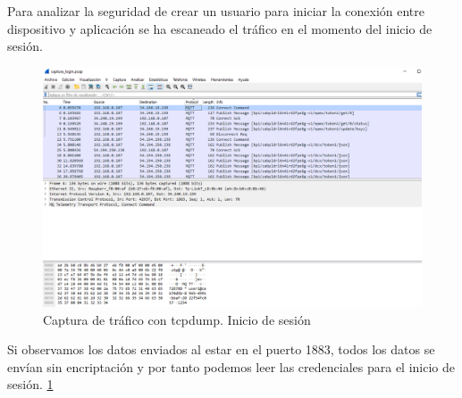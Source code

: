{Para analizar la seguridad de crear un usuario para iniciar la conexión entre dispositivo y aplicación se ha escaneado el tráfico en el momento del inicio de sesión. \\

\begin{figure}[p]
    \centering
    \includegraphics[width=\linewidth]{imagenes/Captura de pantalla 2022-06-26 190942.png}
    \caption{Captura de tráfico con tcpdump. Inicio de sesión}
    \label{fig:figure23-prueba}
\end{figure}

Si observamos los datos enviados al estar en el puerto 1883, todos los datos se envían sin encriptación y por tanto podemos leer las credenciales para el inicio de sesión. \ref{fig:figure23-prueba}

}